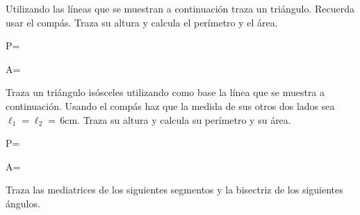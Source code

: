 \documentclass[11pt]{article}
\begin{document}
\begin{multicols}{2}

Utilizando las l\'ineas que se muestran a continuaci\'on traza un tri\'angulo.
Recuerda usar el comp\'as. Traza su altura y calcula el per\'imetro y el \'area.

\vspace{5mm}


\vspace{6cm}


P=

A=

Traza un tri\'angulo is\'osceles utilizando como base la l\'inea que se muestra
a continuaci\'on. Usando el comp\'as haz que la medida de sus otros dos lados
sea $\ell_{1}=\ell_{2}=$\,6cm. Traza su altura y calcula su per\'imetro y su
\'area.


\begin{centering}
    
\vspace{5mm}


\end{centering}

P=

A=

\end{multicols}

\vspace{5mm}

Traza las mediatrices de los siguientes segmentos y la bisectriz de los
siguientes \'angulos.

\vspace{1cm}

\begin{centering}
\end{centering}
\end{document}

